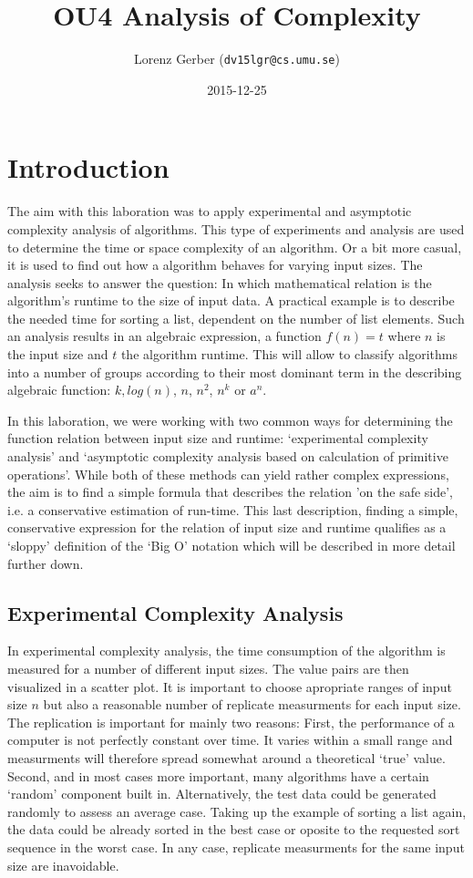 \documentclass[a4paper,11pt,twoside]{article}
\title{OU4 Analysis of Complexity}
\author{Lorenz Gerber  ({\tt{dv15lgr@cs.umu.se}})}
\date{2015-12-25}
\begin{document}
\lstset{language=C}
\maketitle

\tableofcontents
\newpage

\section{Introduction} 
The aim with this laboration was to apply experimental and asymptotic
complexity analysis of algorithms. This type of experiments and
analysis are used to determine the time or space complexity of an 
algorithm. Or a bit more casual, it is used to find out how a
algorithm behaves for varying input sizes. The analysis seeks to 
answer the question: In which mathematical relation is
the algorithm's runtime to the size of input data. A practical 
example is to describe the needed time for sorting a list, dependent 
on the number of list elements. Such an analysis results in an algebraic
expression, a function $f(n) = t$ where $n$ is the input size and $t$
the algorithm runtime. This will allow to classify algorithms into a
number of groups according to their most dominant term in the 
describing algebraic function: $k, log(n)$, $n$, $n^2$, $n^k$ or $a^n$.

In this laboration, we were working with two common ways for
determining the function relation between input size and runtime:
`experimental complexity analysis' and `asymptotic complexity analysis
based on calculation of primitive operations'. While both of these
methods can yield rather complex expressions, the aim is to find a
simple formula that describes the relation 'on the safe side', i.e. a
conservative estimation of run-time. This last description, finding
a simple, conservative expression for the relation of input size and
runtime qualifies as a `sloppy' definition of the `Big O' notation
which will be described in more detail further down.

\subsection{Experimental Complexity Analysis}
In experimental complexity analysis, the time consumption of the
algorithm is measured for a number of different input sizes. The value
pairs are then visualized in a scatter plot. It is important to choose
apropriate ranges of input size $n$ but also a reasonable number of
replicate measurments for each input size. 
The replication is important for mainly two reasons: First, the 
performance of a computer is not perfectly constant over time. 
It varies within a small range and measurments will
therefore spread somewhat around a theoretical `true' value. Second,
and in most cases more important, many algorithms have a certain
`random' component built in. Alternatively, the test data could be
generated randomly to assess an average case. Taking up the
example of sorting a list again, the data could be already sorted in the
best case or oposite to the requested sort sequence in the worst
case. In any case, replicate measurments for the same input size are
inavoidable.
\end{document}
